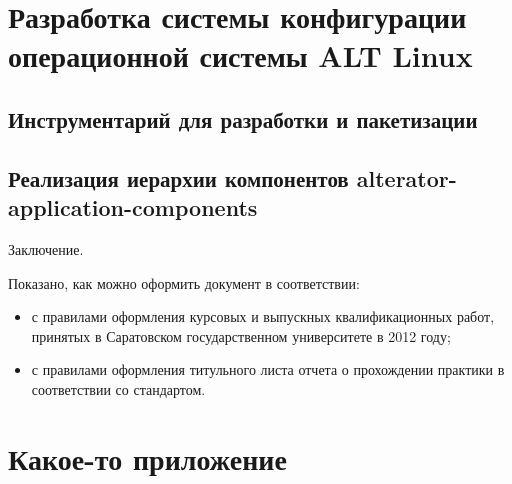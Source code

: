\documentclass[bachelor, och, pract]{SCWorks}
\begin{document}
\section{Разработка системы конфигурации операционной системы ALT Linux}

\subsection{Инструментарий для разработки и пакетизации}

\subsection{Реализация иерархии компонентов alterator-application-components}

\newpage

\conclusion
Заключение.

Показано, как можно оформить документ в соответствии:
\begin{itemize}
    \item с правилами оформления курсовых и выпускных квалификационных работ, принятых в Саратовском государственном университете в 2012 году;
    \item с правилами оформления титульного листа отчета о прохождении практики в соответствии со стандартом.
\end{itemize}


%

%



\appendix

\section{Какое-то приложение}
\end{document}
